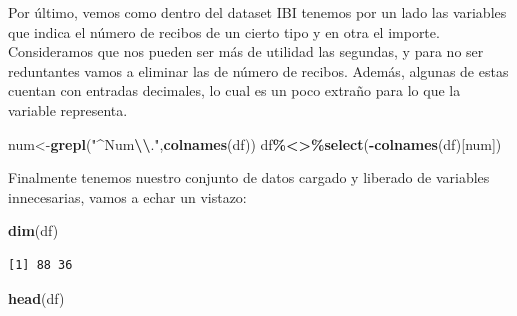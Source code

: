 \documentclass[notspecified,article,submit,moreauthors,pdftex]{Definitions/mdpi}
\newenvironment{Shaded}{\begin{snugshade}}{\end{snugshade}}
\newcommand{\FunctionTok}[1]{\textcolor[rgb]{0.13,0.29,0.53}{\textbf{#1}}}
\newcommand{\NormalTok}[1]{#1}
\newcommand{\OtherTok}[1]{\textcolor[rgb]{0.56,0.35,0.01}{#1}}
\newcommand{\SpecialCharTok}[1]{\textcolor[rgb]{0.81,0.36,0.00}{\textbf{#1}}}
\newcommand{\StringTok}[1]{\textcolor[rgb]{0.31,0.60,0.02}{#1}}
\begin{document}
Por último, vemos como dentro del dataset IBI tenemos por un lado las
variables que indica el número de recibos de un cierto tipo y en otra el
importe. Consideramos que nos pueden ser más de utilidad las segundas, y
para no ser reduntantes vamos a eliminar las de número de recibos.
Además, algunas de estas cuentan con entradas decimales, lo cual es un
poco extraño para lo que la variable representa.

\begin{Shaded}
\begin{Highlighting}[]
\NormalTok{num}\OtherTok{\textless{}{-}}\FunctionTok{grepl}\NormalTok{(}\StringTok{"\^{}Num}\SpecialCharTok{\textbackslash{}\textbackslash{}}\StringTok{."}\NormalTok{,}\FunctionTok{colnames}\NormalTok{(df))}
\NormalTok{df}\SpecialCharTok{\%\textless{}\textgreater{}\%}\FunctionTok{select}\NormalTok{(}\SpecialCharTok{{-}}\FunctionTok{colnames}\NormalTok{(df)[num])}
\end{Highlighting}
\end{Shaded}

Finalmente tenemos nuestro conjunto de datos cargado y liberado de
variables innecesarias, vamos a echar un vistazo:

\begin{Shaded}
\begin{Highlighting}[]
\FunctionTok{dim}\NormalTok{(df)}
\end{Highlighting}
\end{Shaded}

\begin{verbatim}
[1] 88 36
\end{verbatim}

\begin{Shaded}
\begin{Highlighting}[]
\FunctionTok{head}\NormalTok{(df)}
\end{Highlighting}
\end{Shaded}
\end{document}
